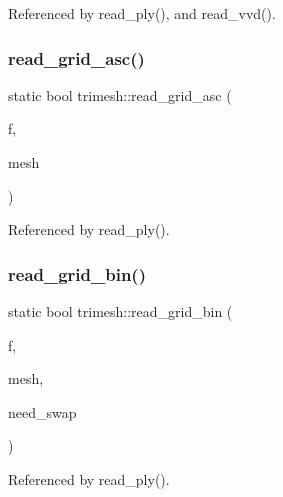 Referenced by read\+\_\+ply(), and read\+\_\+vvd().

\mbox{\label{namespacetrimesh_a32f782399abd88ad764904720a8e351f}} 
\subsubsection{\texorpdfstring{read\+\_\+grid\+\_\+asc()}{read\_grid\_asc()}}
{\footnotesize\ttfamily static bool trimesh\+::read\+\_\+grid\+\_\+asc (\begin{DoxyParamCaption}\item[{F\+I\+LE $\ast$}]{f,  }\item[{\hyperlink{classtrimesh_1_1TriMesh}{Tri\+Mesh} $\ast$}]{mesh }\end{DoxyParamCaption})\hspace{0.3cm}{\ttfamily [static]}}



Referenced by read\+\_\+ply().

\mbox{\label{namespacetrimesh_a7a92c66194fd0ddb7aecee23de456f23}} 
\subsubsection{\texorpdfstring{read\+\_\+grid\+\_\+bin()}{read\_grid\_bin()}}
{\footnotesize\ttfamily static bool trimesh\+::read\+\_\+grid\+\_\+bin (\begin{DoxyParamCaption}\item[{F\+I\+LE $\ast$}]{f,  }\item[{\hyperlink{classtrimesh_1_1TriMesh}{Tri\+Mesh} $\ast$}]{mesh,  }\item[{bool}]{need\+\_\+swap }\end{DoxyParamCaption})\hspace{0.3cm}{\ttfamily [static]}}



Referenced by read\+\_\+ply().

\mbox{\label{namespacetrimesh_a6f5afaf75436495bf724248ceba4eab7}} 
